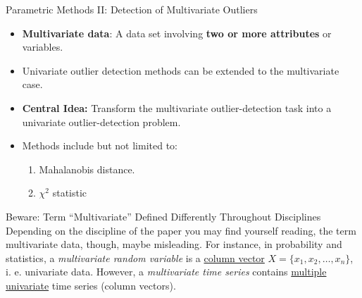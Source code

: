 \begin{frame}{Parametric Methods II: Detection of Multivariate Outliers}
	\begin{itemize}
		\item \textbf{Multivariate data}: A data set involving \textbf{\color{faugray}two or more attributes} or variables.
		\item Univariate outlier detection methods can be extended to the multivariate case.
		\item \textbf{Central Idea:} Transform the multivariate outlier-detection task into a univariate outlier-detection problem.
		\item Methods include but not limited to:
		      \begin{enumerate}
			      \item Mahalanobis distance.
			      \item $\chi^2$ statistic
		      \end{enumerate}
	\end{itemize}
	\begin{alertblock}{Beware: Term ``Multivariate'' Defined Differently Throughout Disciplines}
		Depending on the discipline of the paper you may find yourself reading, the term multivariate data, though, maybe misleading. For instance, in probability and statistics, a \textit{multivariate random variable} is a \underline{column vector} $X=\{x_1, x_2, \dots, x_n\}$, i. e. univariate data. However, a \textit{multivariate time series} contains \underline{multiple univariate} time series (column vectors).
	\end{alertblock}
\end{frame}


